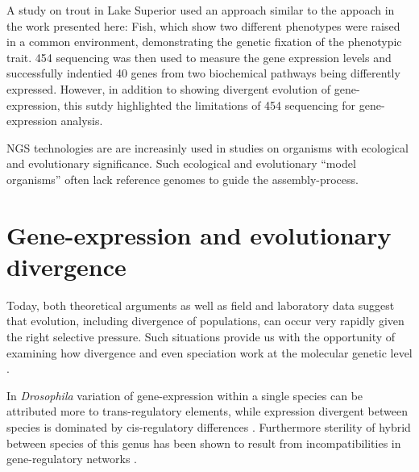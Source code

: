 A study on trout in Lake Superior \cite{pmid20331779} used an approach
similar to the appoach in the work presented here: Fish, which show
two different phenotypes were raised in a common environment,
demonstrating the genetic fixation of the phenotypic trait. 454
sequencing was then used to measure the gene expression levels and
successfully indentied 40 genes from two biochemical pathways being
differently expressed. However, in addition to showing divergent
evolution of gene-expression, this sutdy highlighted the limitations
of 454 sequencing for gene-expression analysis.

NGS technologies are are increasinly used in studies on organisms with
ecological and evolutionary significance. Such ecological and
evolutionary ``model organisms'' often lack reference genomes to guide
the assembly-process.


\section{Gene-expression and evolutionary divergence}

Today, both theoretical arguments as well as field and laboratory data
suggest that evolution, including divergence of populations, can occur
very rapidly given the right selective pressure. Such situations
provide us with the opportunity of examining how divergence and even
speciation work at the molecular genetic level
\cite{via_ecological_2002} .


In \textit{Drosophila} variation of gene-expression within a single
species can be attributed more to trans-regulatory elements, while
expression divergent between species is dominated by cis-regulatory
differences \cite{pmid20354124}. Furthermore sterility of hybrid
between species of this genus has been shown to result from
incompatibilities in gene-regulatory networks \cite{pmid16757655}.



     